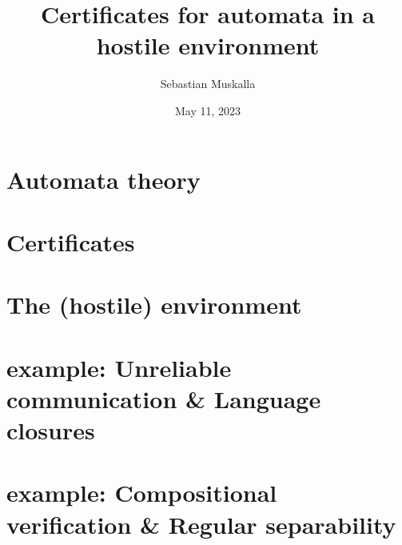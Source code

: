 \documentclass{style/smpresentation}
\title{Certificates for automata in a hostile environment}
\author{Sebastian Muskalla}
\institute{PhD defense}
\date%
{%
    \vspace*{1em}
    May 11, 2023
}%
\begin{document}
\maketitle

    
    

\section{Automata theory}
    
    
    
    
    
    
    

\section{Certificates}
    
    

\section{The (hostile) environment}
    
    
    

    

\section{%
    \texorpdfstring{}{1st} example:%
    \newline%
    Unreliable communication%
    \newline%
    \& Language closures%
}
    
    
    
    
    
    
    
    
    

\section{%
    \texorpdfstring{}{2nd} example:%
    \newline%
    Compositional verification%
    \newline%
    \& Regular separability%
}
    
    
    
    
    
    
    
\end{document}
